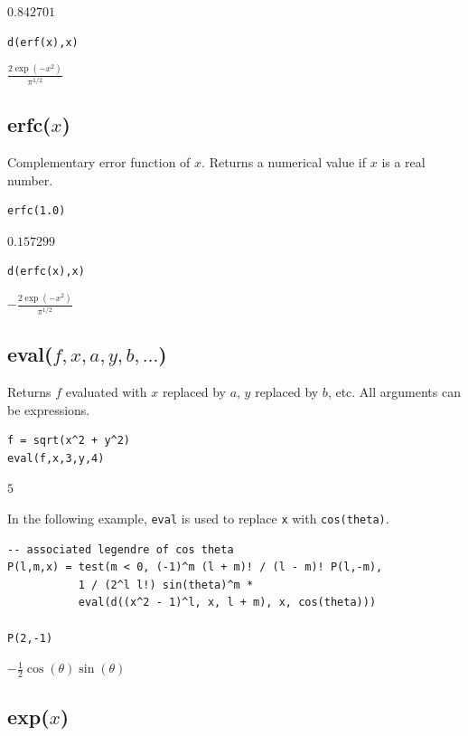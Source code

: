 \documentclass[12pt]{article}
\begin{document}
$0.842701$

{\color{blue}
\begin{verbatim}
d(erf(x),x)
\end{verbatim}
}

$\displaystyle \frac{2\exp(-x^2)}{\pi^{1/2}}$

\subsection*{erfc($x$)}

Complementary error function of $x$.
Returns a numerical value if $x$ is a real number.

{\color{blue}
\begin{verbatim}
erfc(1.0)
\end{verbatim}
}

$0.157299$

{\color{blue}
\begin{verbatim}
d(erfc(x),x)
\end{verbatim}
}

$\displaystyle -\frac{2\exp(-x^2)}{\pi^{1/2}}$

\subsection*{eval($f,x,a,y,b,\ldots$)}

Returns $f$ evaluated with $x$ replaced by $a$, $y$ replaced by $b$, etc.
All arguments can be expressions.

{\color{blue}
\begin{verbatim}
f = sqrt(x^2 + y^2)
eval(f,x,3,y,4)
\end{verbatim}
}

$5$

\bigskip
In the following example, \verb$eval$ is used to replace
\verb$x$ with \verb$cos(theta)$.

{\color{blue}
\begin{verbatim}
-- associated legendre of cos theta
P(l,m,x) = test(m < 0, (-1)^m (l + m)! / (l - m)! P(l,-m),
           1 / (2^l l!) sin(theta)^m *
           eval(d((x^2 - 1)^l, x, l + m), x, cos(theta)))

P(2,-1)
\end{verbatim}
}

$\displaystyle
-\tfrac{1}{2}\cos(\theta)\sin(\theta)
$

\subsection*{exp($x$)}
\end{document}
